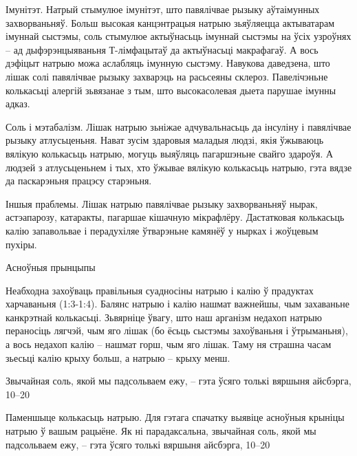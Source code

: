 Імунітэт.
Натрый стымулюе імунітэт, што павялічвае рызыку аўтаімунных захворваньняў. Больш высокая канцэнтрацыя натрыю зьяўляецца актыватарам імуннай сыстэмы, соль стымулюе актыўнасьць імуннай сыстэмы на ўсіх узроўнях – ад дыфэрэнцыяваньня Т-лімфацытаў да актыўнасьці макрафагаў. А вось дэфіцыт натрыю можа аслабляць імунную сыстэму. Навукова даведзена, што лішак солі павялічвае рызыку захварэць на расьсеяны склероз. Павелічэньне колькасьці алергій зьвязанае з тым, што высокасолевая дыета парушае імунны адказ.

Соль і мэтабалізм.
Лішак натрыю зьніжае адчувальнасьць да інсуліну і павялічвае рызыку атлусьценьня. Нават зусім здаровыя маладыя людзі, якія ўжываюць вялікую колькасьць натрыю, могуць выяўляць пагаршэньне свайго здароўя. А людзей з атлусьценьнем і тых, хто ўжывае вялікую колькасьць натрыю, гэта вядзе да паскарэньня працэсу старэньня.

Іншыя праблемы.
Лішак натрыю павялічвае рызыку захворваньняў нырак, астэапарозу, катаракты, пагаршае кішачную мікрафлёру. Дастатковая колькасьць калію запавольвае і перадухіляе ўтварэньне камянёў у нырках і жоўцевым пухіры.

Асноўныя прынцыпы

Неабходна захоўваць правільныя суадносіны натрыю і калію ў прадуктах харчаваньня (1:3-1:4). Балянс натрыю і калію нашмат важнейшы, чым захаваньне канкрэтнай колькасьці. Зьвярніце ўвагу, што наш арганізм недахоп натрыю пераносіць лягчэй, чым яго лішак (бо ёсьць сыстэмы захоўваньня і ўтрыманьня), а вось недахоп калію – нашмат горш, чым яго лішак. Таму ня страшна часам зьесьці калію крыху больш, а натрыю – крыху менш.

Звычайная соль, якой мы падсольваем ежу, – гэта ўсяго толькі вяршыня айсбэрга, 10–20%

Паменшыце колькасьць натрыю.
Для гэтага спачатку выявіце асноўныя крыніцы натрыю ў вашым рацыёне. Як ні парадаксальна, звычайная соль, якой мы падсольваем ежу, – гэта ўсяго толькі вяршыня айсбэрга, 10–20%

